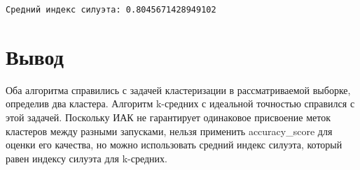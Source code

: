 \documentclass[11pt]{article}
\begin{document}
    \begin{Verbatim}[commandchars=\\\{\}]
Средний индекс силуэта: 0.8045671428949102
    \end{Verbatim}

    \section*{Вывод}\label{ux432ux44bux432ux43eux434}

Оба алгоритма справились с задачей кластеризации в рассматриваемой
выборке, определив два кластера. Алгоритм k-средних с идеальной
точностью справился с этой задачей. Поскольку ИАК не гарантирует
одинаковое присвоение меток кластеров между разными запусками, нельзя
применить accuracy\_score для оценки его качества, но можно использовать
средний индекс силуэта, который равен индексу силуэта для k-средних.
\end{document}
